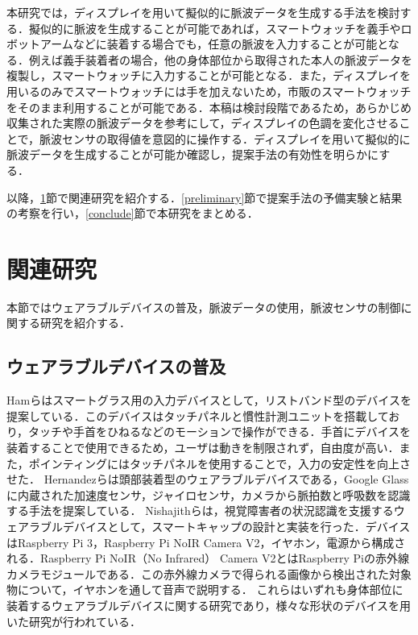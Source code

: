 \documentclass[submit,techrep]{ipsj}
\begin{document}
本研究では，ディスプレイを用いて擬似的に脈波データを生成する手法を検討する．擬似的に脈波を生成することが可能であれば，スマートウォッチを義手やロボットアームなどに装着する場合でも，任意の脈波を入力することが可能となる．例えば義手装着者の場合，他の身体部位から取得された本人の脈波データを複製し，スマートウォッチに入力することが可能となる．また，ディスプレイを用いるのみでスマートウォッチには手を加えないため，市販のスマートウォッチをそのまま利用することが可能である．本稿は検討段階であるため，あらかじめ収集された実際の脈波データを参考にして，ディスプレイの色調を変化させることで，脈波センサの取得値を意図的に操作する．ディスプレイを用いて擬似的に脈波データを生成することが可能か確認し，提案手法の有効性を明らかにする．
\par

以降，\ref{related}節で関連研究を紹介する．\ref{preliminary}節で提案手法の予備実験と結果の考察を行い，\ref{conclude}節で本研究をまとめる．





\section{関連研究}
\label{related}
本節ではウェアラブルデバイスの普及，脈波データの使用，脈波センサの制御に関する研究を紹介する．

\subsection{ウェアラブルデバイスの普及}
Hamら\cite{smart_wristband}はスマートグラス用の入力デバイスとして，リストバンド型のデバイスを提案している．このデバイスはタッチパネルと慣性計測ユニットを搭載しており，タッチや手首をひねるなどのモーションで操作ができる．手首にデバイスを装着することで使用できるため，ユーザは動きを制限されず，自由度が高い．また，ポインティングにはタッチパネルを使用することで，入力の安定性を向上させた．
Hernandezら\cite{bioglass}は頭部装着型のウェアラブルデバイスである，Google Glassに内蔵された加速度センサ，ジャイロセンサ，カメラから脈拍数と呼吸数を認識する手法を提案している．
Nishajithら\cite{smart_cap}は，視覚障害者の状況認識を支援するウェアラブルデバイスとして，スマートキャップの設計と実装を行った．デバイスはRaspberry Pi 3，Raspberry Pi NoIR Camera V2，イヤホン，電源から構成される．Raspberry Pi NoIR（No Infrared） Camera V2とはRaspberry Piの赤外線カメラモジュールである．この赤外線カメラで得られる画像から検出された対象物について，イヤホンを通して音声で説明する．
これらはいずれも身体部位に装着するウェアラブルデバイスに関する研究であり，様々な形状のデバイスを用いた研究が行われている．
\par
\end{document}
